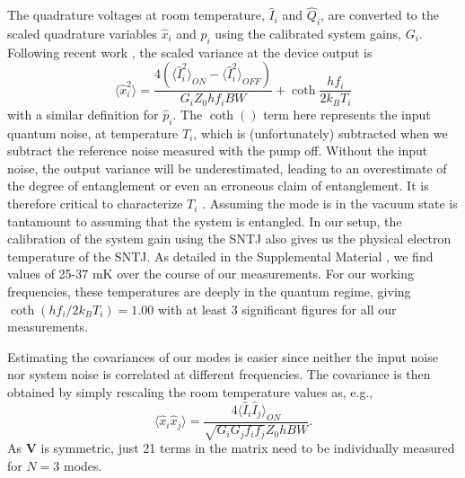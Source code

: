 \documentclass[prl,10pt,twocolumn,superscriptaddress,notitlepage,floatfix,amssymb]{revtex4}
\newcommand*{\ann}[2][a]{\hat{#1}_{#2}}
\newcommand*{\Inp}[1]{\hat{I}_{#1}}
\newcommand*{\Qua}[1]{\hat{Q}_{#1}}
\begin{document}
The quadrature voltages at room temperature, $\Inp{i}$ and $\Qua{i}$, are converted to the scaled quadrature variables $\hat{x}_i$ and $\hat{p}_i$ using the calibrated system gains, $G_i$.  Following recent work \cite{Flurin:2015jf}, the scaled variance at the device output is
\begin{equation}
\langle\ann[x]{i}^2\rangle=\frac{4\left(\langle\Inp{i}^2\rangle_{ON}-\langle\Inp{i}^2\rangle_{OFF}\right)}{G_iZ_0 h f_i BW}+\coth\frac{h f_i}{2k_BT_i}
\end{equation}
with a similar definition for $\hat{p}_i$. The $\coth()$ term here represents the input quantum noise, at temperature $T_i$, which is (unfortunately) subtracted when we subtract the reference noise measured with the pump off. Without the input noise, the output variance will be underestimated, leading to an overestimate of the degree of entanglement or even an erroneous claim of entanglement.  It is therefore critical to characterize $T_i$ \cite{Bruschi:2013cd}.  Assuming the mode is in the vacuum state is tantamount to assuming that the system is entangled. In our setup, the calibration of the system gain using the SNTJ also gives us the physical electron temperature of the SNTJ.  As detailed in the Supplemental Material \cite{SupNote}, we find values of 25-37 mK over the course of our measurements.  For our working frequencies, these temperatures are deeply in the quantum regime, giving $\coth(h f_i/2k_BT_i) = 1.00$ with at least 3 significant figures for all our measurements.

Estimating the covariances of our modes is easier since neither the input noise nor system noise is correlated at different frequencies.  The covariance is then obtained by simply rescaling the room temperature values as, e.g.,
\begin{equation}
\langle\ann[x]{i}\ann[x]{j}\rangle=\frac{4\langle\Inp{i}\Inp{j}\rangle_{ON}}{\sqrt{G_iG_j f_i f_j}Z_0 h BW}.
\end{equation} 
As $\mathbf{V}$ is symmetric, just 21 terms in the matrix need to be individually measured for $N=3$ modes.

\end{document}
